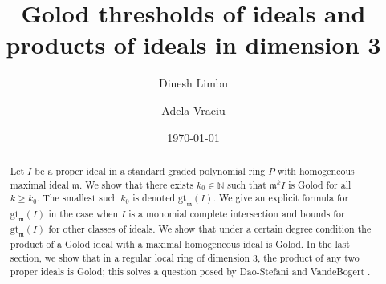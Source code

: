 \documentclass[10pt,reqno]{amsart}
\title[Product of ideals and Golod threshold]{Golod thresholds of ideals  and products of ideals in dimension 3}
\author[D.~Limbu]{Dinesh Limbu}
\author[A.~Vraciu]{Adela Vraciu}
\date{\today}
\theoremstyle{definition}
\theoremstyle{remark}
\numberwithin{equation}{section}
\newcommand{\m}{\mathfrak m}
\numberwithin{equation}{section}
\begin{document}
\begin{abstract}
Let $I$ be a proper ideal in a standard graded polynomial ring $P$ with homogeneous maximal ideal $\m$. We show that there exists $k_0\in \mathbb{N}$ such that $\m^kI$ is Golod for all $k\geq k_0$. The smallest such $k_0$ is denoted $\mathrm{gt}_{\m}(I)$. We give an explicit formula for $\mathrm{gt}_{\m}(I)$ in the case when $I$ is a monomial complete intersection and bounds for $\mathrm{gt}_{\m}(I)$ for other classes of ideals. We show that under a certain degree condition the product of a Golod ideal with a maximal homogeneous ideal is Golod. In the last section, we show that in a regular local ring of dimension 3, the product of any two proper ideals is Golod; this solves a question posed by Dao-Stefani \cite[Question 4.5]{dao2022monomial} and VandeBogert \cite[Question 4.11]{vandebogert2022products}.
\end{abstract} 




\maketitle
\end{document}
